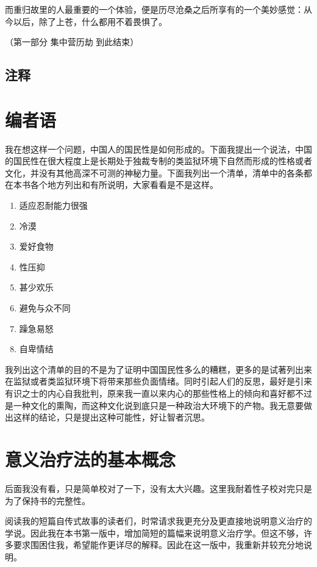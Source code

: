 \documentclass[11pt,oneside]{book}
\begin{document}
\begin{common-format}
而重归故里的人最重要的一个体验，便是历尽沧桑之后所享有的一个美妙感觉：从今以后，除了上苍，什么都用不着畏惧了。

（第一部分 集中营历劫 到此结束）


\section{注释}
\showendnotes

\chapter{编者语}
我在想这样一个问题，中国人的国民性是如何形成的。下面我提出一个说法，中国的国民性在很大程度上是长期处于独裁专制的类监狱环境下自然而形成的性格或者文化，并没有其他高深不可测的神秘力量。下面我列出一个清单，清单中的各条都在本书各个地方列出和有所说明，大家看看是不是这样。
\begin{enumerate}
\item 适应忍耐能力很强 \pageref{适应}
\item 冷漠 \pageref{冷漠}
\item 爱好食物 \pageref{爱好食物}
\item 性压抑 \pageref{性压抑}
\item 甚少欢乐 \pageref{甚少快乐}
\item 避免与众不同 \pageref{不要与众不同}
\item 躁急易怒 \pageref{躁急易怒}
\item 自卑情结 \pageref{自卑情结}
\end{enumerate}

我列出这个清单的目的不是为了证明中国国民性多么的糟糕，更多的是试著列出来在监狱或者类监狱环境下将带来那些负面情绪。同时引起人们的反思，最好是引来有识之士的内心自我批判，原来我一直以来内心的那些性格上的倾向和喜好都不过是一种文化的熏陶，而这种文化说到底只是一种政治大环境下的产物。我无意要做出这样的结论，只是提出这种可能性，好让智者沉思。




\chapter{意义治疗法的基本概念}
后面我没有看，只是简单校对了一下，没有太大兴趣。这里我耐着性子校对完只是为了保持书的完整性。

阅读我的短篇自传式故事的读者们，时常请求我更充分及更直接地说明意义治疗的学说。因此我在本书第一版中，增加简短的篇幅来说明意义治疗学。但这不够，许多要求围困住我，希望能作更详尽的解释。因此在这一版中，我重新并较充分地说明。


\end{common-format}
\end{document}
